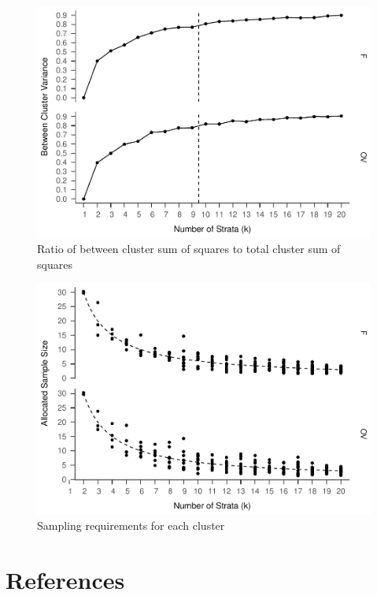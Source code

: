 \documentclass[floatsintext,man]{apa6}
\theoremstyle{definition}
\theoremstyle{definition}
\theoremstyle{definition}
\theoremstyle{remark}
\begin{document}
\begin{figure}
\centering
\includegraphics{Method_files/figure-latex/ratio-full-1.pdf}
\caption{\label{fig:ratio-full}Ratio of between cluster sum of squares to
total cluster sum of squares}
\end{figure}

\begin{figure}
\centering
\includegraphics{Method_files/figure-latex/k-size-full-1.pdf}
\caption{\label{fig:k-size-full}Sampling requirements for each cluster}
\end{figure}

\newpage

\section{References}\label{references}

\begingroup
\setlength{\parindent}{-0.5in} \setlength{\leftskip}{0.5in}

\hypertarget{refs}{}

\endgroup
\end{document}
